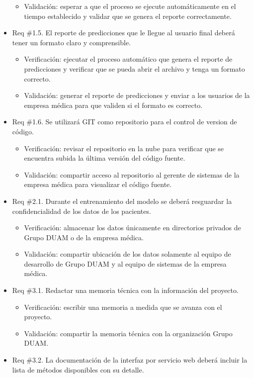 \documentclass[
11pt, %
]{charter}
\begin{document}
\begin{itemize}
\begin{itemize}
		\item Validación: esperar a que el proceso se ejecute automáticamente en el tiempo establecido y validar que se genera el reporte correctamente.
	\end{itemize}
	\item Req \#1.5. El reporte de predicciones que le llegue al usuario final deberá tener un formato claro y comprensible.
	\begin{itemize}
		\item Verificación: ejecutar el proceso automático que genera el reporte de predicciones y verificar que se pueda abrir el archivo y tenga un formato correcto.
		\item Validación: generar el reporte de predicciones y enviar a los usuarios de la empresa médica para que validen si el formato es correcto.
	\end{itemize}
	\item Req \#1.6. Se utilizará GIT como repositorio para el control de version de código.
	\begin{itemize}
		\item Verificación: revisar el repositorio en la nube para verificar que se encuentra subida la última versión del código fuente.
		\item Validación: compartir acceso al repositorio al gerente de sistemas de la empresa médica para visualizar el código fuente.
	\end{itemize}	
	\item Req \#2.1. Durante el entrenamiento del modelo se deberá resguardar la confidencialidad de los datos de los pacientes.	
	\begin{itemize}
		\item Verificación: almacenar los datos únicamente en directorios privados de Grupo DUAM o de la empresa médica.
		\item Validación: compartir ubicación de los datos solamente al equipo de desarrollo de Grupo DUAM y al equipo de sistemas de la empresa médica.
	\end{itemize}
	\item Req \#3.1. Redactar una memoria técnica con la información del proyecto.
	\begin{itemize}
		\item Verificación: escribir una memoria a medida que se avanza con el proyecto.
		\item Validación: compartir la memoria técnica con la organización Grupo DUAM.
	\end{itemize}
	\item Req \#3.2. La documentación de la interfaz por servicio web deberá incluir la lista de métodos disponibles con su detalle.

\end{itemize}
\end{document}
